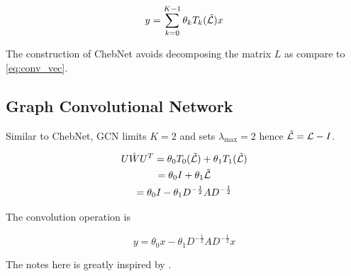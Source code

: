 \documentclass{article}
\begin{document}
\begin{equation}
    y = \sum_{k=0}^{K-1} \theta_k T_k(\Tilde{\mathcal{L}}) x
\end{equation}



The construction of ChebNet avoids decomposing the matrix $L$ as compare to \ref{eq:conv_vec}.

\subsection{Graph Convolutional Network}

Similar to ChebNet, GCN \cite{kipf2016semi} limits $K = 2$ and sets $\lambda_{\max} = 2$ hence $\Tilde{\mathcal{L}} = \mathcal{L} - I$.

\begin{gather*}
    U \hat{W} U^T = \theta_0 T_0(\Tilde{\mathcal{L}}) + \theta_1 T_1(\Tilde{\mathcal{L}}) \\
    = \theta_0 I + \theta_1 \Tilde{\mathcal{L}} \\
    = \theta_0 I - \theta_1 D^{-\frac{1}{2}} A D^{-\frac{1}{2}}
\end{gather*}

The convolution operation is

\begin{equation}
    y = \theta_0 x - \theta_1 D^{-\frac{1}{2}} A D^{-\frac{1}{2}} x
\end{equation}

The notes here is greatly inspired by \cite{chen2020note}.



\end{document}
